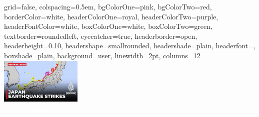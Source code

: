 \documentclass[landscape,final,a0paper]{../baposter}
\begin{document}

\newlength{\leftimgwidth}
\begin{poster}%
  {
  grid=false,
  colspacing=0.5em,
  bgColorOne=pink,
  bgColorTwo=red,
  borderColor=white,
  headerColorOne=royal,
  headerColorTwo=purple,
  headerFontColor=white,
  boxColorOne=white,
  boxColorTwo=green,
  textborder=roundedleft,
  eyecatcher=true,
  headerborder=open,
  headerheight=0.10\textheight,
  headershape=smallrounded,
  headershade=plain,
  headerfont=\Large\sf\mdseries, 
  boxshade=plain,
  background=user,
  linewidth=2pt,
  columns=12
  }
  {\includegraphics[width=10.5em]{Blackboard files/img/je.png}} %
  {\sffamily\bfsereies\textcolor{white}{ %
   Seismographic Modelling via Hawkes Processes}}
  {\sf %
  \vspace{1em} 
	\textcolor{white}{David Ye \quad CID: 02395607 \quad dy1223@ic.ac.uk}\\
  }
  { %
    }
\end{poster}
\end{document}
